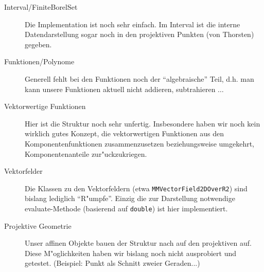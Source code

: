 \documentclass[a4paper,12pt]{article}
\newcommand{\code}[1]{\texttt{#1}}
\begin{document}
\begin{description}

\item [Interval/FiniteBorelSet]
Die Implementation ist noch sehr einfach. Im Interval ist die interne
Datendarstellung sogar noch in den projektiven Punkten (von Thorsten) gegeben.

\item [Funktionen/Polynome]
Generell fehlt bei den Funktionen noch der ``algebraische'' Teil, d.h.
man kann unsere Funktionen aktuell nicht addieren, subtrahieren $\ldots$

\item [Vektorwertige Funktionen]
Hier ist die Struktur noch sehr unfertig. Insbesondere haben wir noch kein
wirklich gutes Konzept, die vektorwertigen Funktionen aus den
Komponentenfunktionen zusammenzusetzen beziehungsweise umgekehrt,
Komponentenanteile zur"uckzukriegen.

\item [Vektorfelder]
Die Klassen zu den Vektorfeldern (etwa \code{MMVectorField2DOverR2}) sind
bislang lediglich ``R"umpfe''. Einzig die zur Darstellung notwendige
evaluate-Methode (basierend auf \code{double}) ist hier implementiert.

\item [Projektive Geometrie]
Unser affinen Objekte bauen der Struktur nach auf den projektiven auf. Diese
M"oglichkeiten haben wir bislang noch nicht ausprobiert und getestet.
(Beispiel: Punkt als Schnitt zweier Geraden...)

\end{description}
\end{document}
